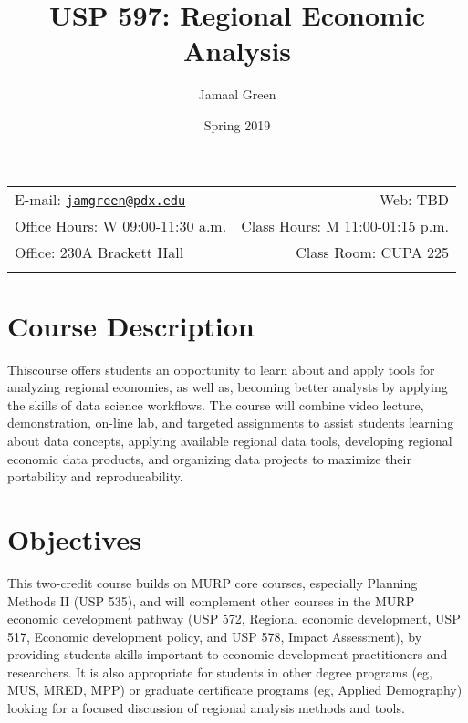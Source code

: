 \documentclass[11pt,]{article}
\title{USP 597: Regional Economic Analysis}
\author{Jamaal Green}
\date{Spring 2019}
\begin{document}
  

		\maketitle
		
	
		\thispagestyle{firststyle}



	\noindent \begin{tabular*}{\textwidth}{ @{\extracolsep{\fill}} lr @{\extracolsep{\fill}}}


E-mail: \texttt{\href{mailto:jamgreen@pdx.edu}{\nolinkurl{jamgreen@pdx.edu}}} & Web: TBD\\
Office Hours: W 09:00-11:30 a.m.  &  Class Hours: M 11:00-01:15 p.m.\\
Office: 230A Brackett Hall  & Class Room: CUPA 225\\
	&  \\
	\hline
	\end{tabular*}
	
\vspace{2mm}
	


\section{Course Description}\label{course-description}

Thiscourse offers students an opportunity to learn about and apply tools
for analyzing regional economies, as well as, becoming better analysts
by applying the skills of data science workflows. The course will
combine video lecture, demonstration, on-line lab, and targeted
assignments to assist students learning about data concepts, applying
available regional data tools, developing regional economic data
products, and organizing data projects to maximize their portability and
reproducability.

\section{Objectives}\label{objectives}

This two-credit course builds on MURP core courses, especially Planning
Methods II (USP 535), and will complement other courses in the MURP
economic development pathway (USP 572, Regional economic development,
USP 517, Economic development policy, and USP 578, Impact Assessment),
by providing students skills important to economic development
practitioners and researchers. It is also appropriate for students in
other degree programs (eg, MUS, MRED, MPP) or graduate certificate
programs (eg, Applied Demography) looking for a focused discussion of
regional analysis methods and tools.
\end{document}
